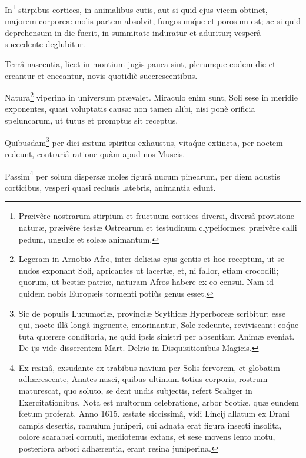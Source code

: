 \documentclass[a4paper, 11pt, oneside, polutonikogreek, german]{article}
\begin{document}
In\footnote{Præivêre nostrarum stirpium et fructuum cortices diversi, diversâ provisione naturæ, præivêre testæ Ostrearum et testudinum clypeiformes: præivêre calli pedum, ungulæ et soleæ animantum.} stirpibus cortices, in animalibus cutis, aut si quid ejus vicem obtinet, majorem corporeæ molis partem absolvit, fungosum\'que et porosum est; ac si quid deprehensum in die fuerit, in summitate induratur et aduritur; vesperâ succedente deglubitur.

Terrâ nascentia, licet in montium jugis pauca sint, plerumque eodem die et creantur et enecantur, novis quotidiè succrescentibus.

Natura\footnote{Legeram in Arnobio Afro, inter delicias ejus gentis et hoc receptum, ut se nudos exponant Soli, apricantes ut lacertæ, et, ni fallor, etiam crocodili; quorum, ut bestiæ patriæ, naturam Afros habere ex eo censui. Nam id quidem nobis Europæis tormenti potiùs genus esset.} viperina in universum prævalet. Miraculo enim sunt, Soli sese in meridie exponentes, quasi voluptatis causa: non tamen alibi, nisi ponè orificia speluncarum, ut tutus et promptus sit receptus.

Quibusdam\footnote{Sic de populis Lucumoriæ, provinciæ Scythicæ Hyperboreæ scribitur: esse qui, nocte illâ longâ ingruente, emorinantur, Sole redeunte, reviviscant: eo\'que tuta quærere conditoria, ne quid ipsis sinistri per absentiam Animæ eveniat. De ijs vide disserentem Mart. Delrio in Disquisitionibus Magicis.} per diei æstum spiritus exhaustus, vita\'que extincta, per noctem redeunt, contrariâ ratione quàm apud nos Muscis.

Passim\footnote{Ex resinâ, exsudante ex trabibus navium per Solis fervorem, et globatim adhærescente, Anates nasci, quibus ultimum totius corporis, rostrum maturescat, quo soluto, se dent undis subjectis, refert Scaliger in Exercitationibus. Nota est multorum celebratione, arbor Scotiæ, quæ eundem fœtum proferat. Anno 1615. æstate siccissimâ, vidi Lincij allatum ex Drani campis desertis, ramulum juniperi, cui adnata erat figura insecti insolita, colore scarabæi cornuti, mediotenus extans, et sese movens lento motu, posteriora arbori adhærentia, erant resina juniperina.} per solum dispersæ moles figurâ nucum pinearum, per diem adustis corticibus, vesperi quasi reclusis latebris, animantia edunt.
\end{document}
